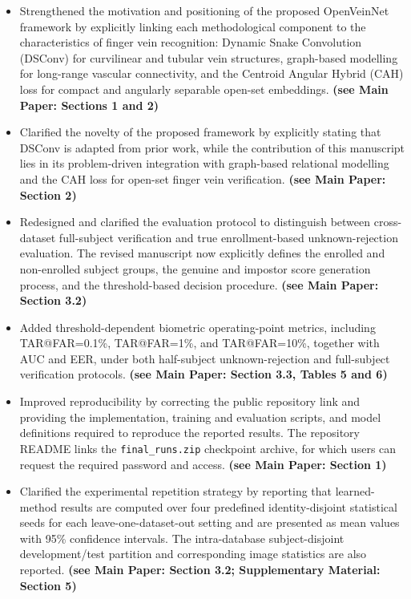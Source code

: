 \documentclass[11pt]{article}
\theoremstyle{remark}
\begin{document}
\begin{itemize}
    \item Strengthened the motivation and positioning of the proposed OpenVeinNet framework by explicitly linking each methodological component to the characteristics of finger vein recognition: Dynamic Snake Convolution (DSConv) for curvilinear and tubular vein structures, graph-based modelling for long-range vascular connectivity, and the Centroid Angular Hybrid (CAH) loss for compact and angularly separable open-set embeddings. \textbf{(see Main Paper: Sections 1 and 2)}
    
    \item Clarified the novelty of the proposed framework by explicitly stating that DSConv is adapted from prior work, while the contribution of this manuscript lies in its problem-driven integration with graph-based relational modelling and the CAH loss for open-set finger vein verification. \textbf{(see Main Paper: Section 2)}
    
    \item Redesigned and clarified the evaluation protocol to distinguish between cross-dataset full-subject verification and true enrollment-based unknown-rejection evaluation. The revised manuscript now explicitly defines the enrolled and non-enrolled subject groups, the genuine and impostor score generation process, and the threshold-based decision procedure. \textbf{(see Main Paper: Section 3.2)}
    
    \item Added threshold-dependent biometric operating-point metrics, including TAR@FAR=0.1\%, TAR@FAR=1\%, and TAR@FAR=10\%, together with AUC and EER, under both half-subject unknown-rejection and full-subject verification protocols. \textbf{(see Main Paper: Section 3.3, Tables 5 and 6)}
    
    \item Improved reproducibility by correcting the public repository link and providing the implementation, training and evaluation scripts, and model definitions required to reproduce the reported results. The repository README links the \texttt{final\_runs.zip} checkpoint archive, for which users can request the required password and access. \textbf{(see Main Paper: Section 1)}
    
    \item Clarified the experimental repetition strategy by reporting that learned-method results are computed over four predefined identity-disjoint statistical seeds for each leave-one-dataset-out setting and are presented as mean values with 95\% confidence intervals. The intra-database subject-disjoint development/test partition and corresponding image statistics are also reported. \textbf{(see Main Paper: Section 3.2; Supplementary Material: Section 5)}
    

\end{itemize}
\end{document}
